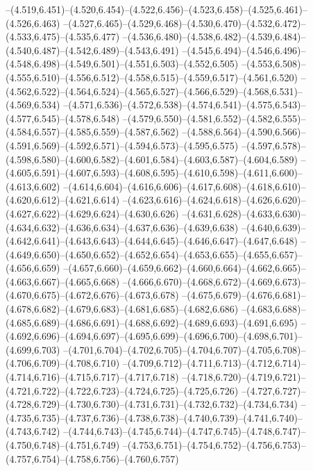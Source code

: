   --(4.519,6.451)--(4.520,6.454)--(4.522,6.456)--(4.523,6.458)--(4.525,6.461)--(4.526,6.463)%
  --(4.527,6.465)--(4.529,6.468)--(4.530,6.470)--(4.532,6.472)--(4.533,6.475)--(4.535,6.477)%
  --(4.536,6.480)--(4.538,6.482)--(4.539,6.484)--(4.540,6.487)--(4.542,6.489)--(4.543,6.491)%
  --(4.545,6.494)--(4.546,6.496)--(4.548,6.498)--(4.549,6.501)--(4.551,6.503)--(4.552,6.505)%
  --(4.553,6.508)--(4.555,6.510)--(4.556,6.512)--(4.558,6.515)--(4.559,6.517)--(4.561,6.520)%
  --(4.562,6.522)--(4.564,6.524)--(4.565,6.527)--(4.566,6.529)--(4.568,6.531)--(4.569,6.534)%
  --(4.571,6.536)--(4.572,6.538)--(4.574,6.541)--(4.575,6.543)--(4.577,6.545)--(4.578,6.548)%
  --(4.579,6.550)--(4.581,6.552)--(4.582,6.555)--(4.584,6.557)--(4.585,6.559)--(4.587,6.562)%
  --(4.588,6.564)--(4.590,6.566)--(4.591,6.569)--(4.592,6.571)--(4.594,6.573)--(4.595,6.575)%
  --(4.597,6.578)--(4.598,6.580)--(4.600,6.582)--(4.601,6.584)--(4.603,6.587)--(4.604,6.589)%
  --(4.605,6.591)--(4.607,6.593)--(4.608,6.595)--(4.610,6.598)--(4.611,6.600)--(4.613,6.602)%
  --(4.614,6.604)--(4.616,6.606)--(4.617,6.608)--(4.618,6.610)--(4.620,6.612)--(4.621,6.614)%
  --(4.623,6.616)--(4.624,6.618)--(4.626,6.620)--(4.627,6.622)--(4.629,6.624)--(4.630,6.626)%
  --(4.631,6.628)--(4.633,6.630)--(4.634,6.632)--(4.636,6.634)--(4.637,6.636)--(4.639,6.638)%
  --(4.640,6.639)--(4.642,6.641)--(4.643,6.643)--(4.644,6.645)--(4.646,6.647)--(4.647,6.648)%
  --(4.649,6.650)--(4.650,6.652)--(4.652,6.654)--(4.653,6.655)--(4.655,6.657)--(4.656,6.659)%
  --(4.657,6.660)--(4.659,6.662)--(4.660,6.664)--(4.662,6.665)--(4.663,6.667)--(4.665,6.668)%
  --(4.666,6.670)--(4.668,6.672)--(4.669,6.673)--(4.670,6.675)--(4.672,6.676)--(4.673,6.678)%
  --(4.675,6.679)--(4.676,6.681)--(4.678,6.682)--(4.679,6.683)--(4.681,6.685)--(4.682,6.686)%
  --(4.683,6.688)--(4.685,6.689)--(4.686,6.691)--(4.688,6.692)--(4.689,6.693)--(4.691,6.695)%
  --(4.692,6.696)--(4.694,6.697)--(4.695,6.699)--(4.696,6.700)--(4.698,6.701)--(4.699,6.703)%
  --(4.701,6.704)--(4.702,6.705)--(4.704,6.707)--(4.705,6.708)--(4.706,6.709)--(4.708,6.710)%
  --(4.709,6.712)--(4.711,6.713)--(4.712,6.714)--(4.714,6.716)--(4.715,6.717)--(4.717,6.718)%
  --(4.718,6.720)--(4.719,6.721)--(4.721,6.722)--(4.722,6.723)--(4.724,6.725)--(4.725,6.726)%
  --(4.727,6.727)--(4.728,6.729)--(4.730,6.730)--(4.731,6.731)--(4.732,6.732)--(4.734,6.734)%
  --(4.735,6.735)--(4.737,6.736)--(4.738,6.738)--(4.740,6.739)--(4.741,6.740)--(4.743,6.742)%
  --(4.744,6.743)--(4.745,6.744)--(4.747,6.745)--(4.748,6.747)--(4.750,6.748)--(4.751,6.749)%
  --(4.753,6.751)--(4.754,6.752)--(4.756,6.753)--(4.757,6.754)--(4.758,6.756)--(4.760,6.757)%
